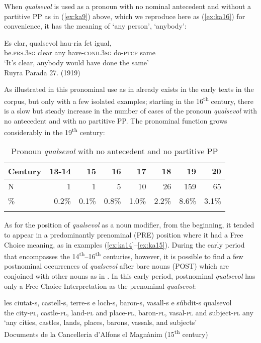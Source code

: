 \documentclass[output=paper,colorlinks,citecolor=brown]{langscibook}
\begin{document}
When \textit{qualsevol} is used as a pronoun with no nominal antecedent and without a partitive PP as in (\ref{ex:ka9}) above, which we reproduce here as (\ref{ex:ka16}) for convenience, it has the meaning of ‘any person’, ‘anybody’:

\ea \label{ex:ka16}
\gll Es clar, qualsevol hau-ria fet igual,\\
    be.\textsc{prs.3sg} clear any have-\textsc{cond.3sg} do-\textsc{ptcp} same\\
\glt ‘It’s clear, anybody would have done the same’\\
    Ruyra Parada 27. (1919)\\
\z

As illustrated in  this pronominal use as in  already exists in the early texts in the corpus, but only with a few isolated examples; starting in the 16\textsuperscript{th} century, there is a slow but steady increase in the number of cases of the pronoun \textit{qualsevol} with no antecedent and with no partitive PP. The pronominal function grows considerably in the 19\textsuperscript{th} century:

\begin{table}
    \begin{tabular}{lrrrrrrr} 
    \lsptoprule
    Century & 13-14	& 15 & 16 & 17 & 18 & 19 & 20 \\
    \midrule
    N & 1 & 1 & 5 & 10 & 26 & 159 & 65 \\
    \% & 0.2\% & 0.1\% & 0.8\% & 1.0\%	& 2.2\%	& 8.6\%	& 3.1\% \\
    \lspbottomrule
    \end{tabular}
    \caption{Pronoun \textit{qualsevol} with no antecedent and no partitive PP}
    \label{tab:ka6}
\end{table}  


As for the position of \textit{qualsevol} as a noun modifier, from the beginning, it tended to appear in a predominantly prenominal (PRE) position where it had a Free Choice meaning, as in examples (\ref{ex:ka14}--\ref{ex:ka15}). During the early period that encompasses the 14\textsuperscript{th}--16\textsuperscript{th} centuries, however, it is possible to find a few postnominal occurrences of \textit{qualsevol} after bare nouns (POST) which are conjoined with other nouns as in . In this early period, postnominal \textit{qualsevol} has only a Free Choice Interpretation as the prenominal \textit{qualsevol}:

\ea \label{ex:ka17}
\gll les ciutat-s, castell-s, terre-s e loch-s, baron-s, vasall-s e súbdit-s qualsevol\\
    the city-\textsc{pl}, castle-\textsc{pl}, land-\textsc{pl} and place-\textsc{pl}, baron-\textsc{pl}, vasal-\textsc{pl} and subject-\textsc{pl} any\\
\glt ‘any cities, castles, lands, places, barons, vassals, and subjects’\\
    Documents de la Cancelleria d'Alfons el Magnànim (15\textsuperscript{th} century)\\
\z
\end{document}
